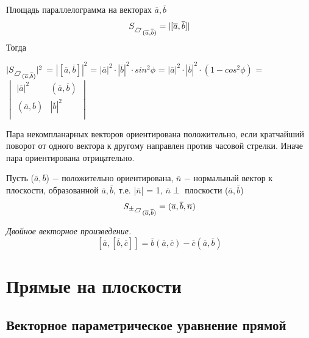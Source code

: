 Площадь параллелограмма на векторах $\overline{a}, \overline{b}$
\[
S\mkern-2mu{\rotatebox{-60}{\(\lozenge\)}}_{(\overline{a}, \overline{b})} = |[\overline{a}, \overline{b}]|
\]
Тогда
\begin{center}
    $|S\mkern-2mu{\rotatebox{-60}{\(\lozenge\)}}_{(\overline{a}, \overline{b})}|^2$ = $|[\overline{a}, \overline{b}]|^2$ = $|\overline{a}|^2\cdot|\overline{b}|^2\cdot sin^2 \phi$ = $|\overline{a}|^2\cdot|\overline{b}|^2\cdot(1 - cos^2\phi)$ = 
    $\begin{vmatrix}
        |\overline{a}|^2 & (\overline{a}, \overline{b})\\
        (\overline{a}, \overline{b}) & |\overline{b}|^2\\
    \end{vmatrix}$
\end{center}

\begin{definition}
    Пара некомпланарных векторов ориентирована $\textit{положительно}$, если кратчайший поворот от одного вектора к другому направлен против часовой стрелки. Иначе пара ориентирована $\textit{отрицательно}$.
\end{definition}

Пусть ($\overline{a}, \overline{b}$) $-$ положительно ориентирована, $\overline{n}$ $-$ $\textit{нормальный вектор}$ к плоскости, образованной $\overline{a}, \overline{b}$, т.е. |$\overline{n}$| = 1, $\overline{n}\perp$ плоскости ($\overline{a}, \overline{b}$)
\[
S_{\pm}\mkern-2mu{\rotatebox{-60}{\(\lozenge\)}}_{(\overline{a}, \overline{b})} = (\overline{a}, \overline{b}, \overline{n})
\]
\begin{lemma}
    \textit{Двойное векторное произведение.}
    \[
    [\overline{a}, [\overline{b}, \overline{c}]] = \overline{b}(\overline{a}, \overline{c}) - \overline{c}(\overline{a}, \overline{b})
    \]
\end{lemma}















\section{Прямые на плоскости}

\subsection{Векторное параметрическое уравнение прямой}


